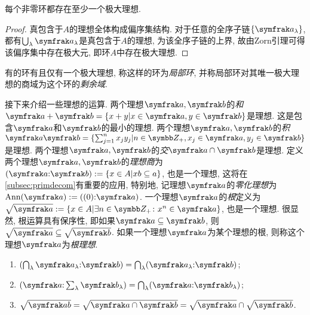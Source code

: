 \begin{theorem}\label{thm:maxideal}
    每个非零环都存在至少一个极大理想.
\end{theorem}

\begin{proof}
    真包含于$A$的理想全体构成偏序集结构. 对于任意的全序子链$\{\ideal{a}_\lambda\}$, 都有$\bigcup_{\lambda}\ideal{a}_\lambda$是真包含于$A$的理想, 为该全序子链的上界, 故由Zorn引理可得该偏序集中存在极大元, 即环$A$中存在极大理想.
\end{proof}

有的环有且仅有一个极大理想, 称这样的环为\emph{局部环}, 并称局部环对其唯一极大理想的商域为这个环的\emph{剩余域}.

接下来介绍一些理想的运算. 两个理想$\ideal{a}, \ideal{b}$的\emph{和}$\ideal{a}+\ideal{b}=\{x+y\vert x\in\ideal{a}, y\in\ideal{b}\}$是理想. 这是包含$\ideal{a}$和$\ideal{b}$的最小的理想. 两个理想$\ideal{a}, \ideal{b}$的\emph{积}$\ideal{a}\ideal{b}=\{\sum_{j=1}^n x_jy_j\vert n\in\ZZ_+, x_j\in\ideal{a}, y_j\in\ideal{b}\}$是理想. 两个理想$\ideal{a}, \ideal{b}$的\emph{交}$\ideal{a}\cap\ideal{b}$是理想. 定义两个理想$\ideal{a}, \ideal{b}$的\emph{理想商}为$(\ideal{a}{:}\ideal{b}):=\{x\in A\vert xb\subseteq a\}$, 也是一个理想, 这将在\ref{subsec:primdecom}有重要的应用, 特别地, 记理想$\ideal{a}$的\emph{零化理想}为$\Ann(\ideal{a}):=((0){:}\ideal{a})$. 一个理想$\ideal{a}$的\emph{根}定义为$\sqrt{\ideal{a}}:=\{x\in A\vert \exists n\in\ZZ_+\colon x^n\in\ideal{a}\}$, 也是一个理想. 很显然, 根运算具有保序性, 即如果$\ideal{a}\subseteq\ideal{b}$, 则$\sqrt{\ideal{a}}\subseteq\sqrt{\ideal{b}}$. 如果一个理想$\ideal{a}$为某个理想的根, 则称这个理想$\ideal{a}$为\emph{根理想}.

\begin{proposition}\label{prop:idealop}\leavevmode
    \begin{enumerate}
        \item\label{enum:prop-idealop-quot-firstcap} $(\bigcap_\lambda \ideal{a}_\lambda{:}\ideal{b})=\bigcap_{\lambda}(\ideal{a}_\lambda{:}\ideal{b})$;
        \item $(\ideal{a}{:}\sum_{\lambda}\ideal{b}_\lambda)=\bigcap_{\lambda}(\ideal{a}{:}\ideal{b}_\lambda)$;
        \item\label{enum:prop-idealop-rad-inters} $\sqrt{\ideal{ab}}=\sqrt{\ideal{a}\cap\ideal{b}}=\sqrt{\ideal{a}}\cap\sqrt{\ideal{b}}$.
    \end{enumerate}
\end{proposition}

